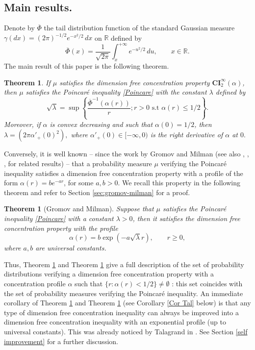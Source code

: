 \documentclass[11pt]{amsart}
\newtheorem{thm}[equation]{Theorem}
\numberwithin{equation}{section}
\begin{document}
\subsection{Main results.}

Denote by 
$\overline{\Phi}$ the tail distribution function of the standard Gaussian measure $\gamma(dx)=(2\pi)^{-1/2} e^{-x^2/2}\,dx$ on ${\mathbb{R}}$ defined by 
\[
\overline{\Phi} (x) = \frac{1}{\sqrt{2\pi}}\int_{x}^{+\infty} e^{-u^2/2}\,du,\qquad x\in {\mathbb{R}}.
\]
The main result of this paper is the following theorem. 

\begin{thm}\label{main result} 
If $\mu$ satisfies the dimension free concentration property $\mathbf{CI}_2^\infty(\alpha)$, then  $\mu$ satisfies the Poincar\'e inequality \eqref{Poincare} with the constant $\lambda$ defined by
\[
\sqrt{\lambda}= \sup\left\{\frac{ \overline{\Phi}^{-1} \left(\alpha(r)\right)}{r}; r> 0 \text{ s.t } \alpha(r)\leq 1/2  \right\}.
\]
Moreover, if $\alpha$ is convex decreasing and such that $\alpha(0)=1/2$, then $\lambda=(2\pi \alpha'_+(0)^2),$ where $\alpha'_+(0) \in [-\infty, 0)$ is the right derivative of $\alpha$ at $0.$
\end{thm}

Conversely, it is well known -- since the work by Gromov and Milman \cite{GM83} (see also \cite{AS94}, \cite{BL97}, \cite{Sch98}, \cite{Goz10} for related results) -- that a probability measure $\mu$ verifying the Poincar\'e inequality satisfies a dimension free concentration property with a profile of the form $\alpha(r)=be^{-ar}$, for some $a,b>0$. We recall this property in the following theorem and refer to Section \ref{sec:gromov-milman} for a proof. 

\begin{thm}[Gromov and Milman]\label{Gromov Milman}
Suppose that $\mu$ satisfies the Poincar\'e inequality \eqref{Poincare} with a constant $\lambda>0$, then it satisfies the dimension free concentration property with the profile 
\[
\alpha(r)=b\exp(-a\sqrt{\lambda}r),\qquad r\geq0,
\]
where $a,b$ are universal constants.
\end{thm}

Thus, Theorem \ref{main result} and Theorem \ref{Gromov Milman} give a full description of the set of probability distributions verifying a dimension free concentration property with a concentration profile $\alpha$ such that $\{r :\alpha(r)<1/2\}\neq \emptyset$ : this set coincides with the set of probability measures verifying the Poincar\'e inequality. An immediate corollary of Theorem \ref{main result} and Theorem \ref{Gromov Milman} (see Corollary \ref{Cor Tal} below) is that any type of dimension free concentration inequality can always be improved into a dimension free concentration inequality with an exponential profile (up to universal constants). This was already noticed by Talagrand in \cite{Tal91}. See Section \ref{self improvement} for a further discussion.
\end{document}
